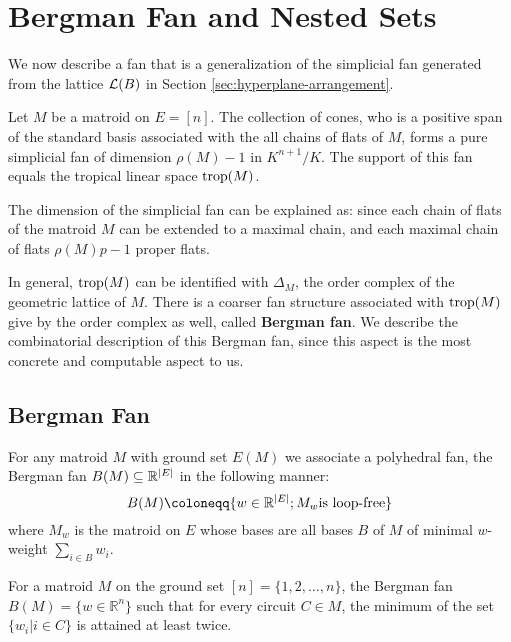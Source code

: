 \section{Bergman Fan and Nested Sets}
\label{sec:bergman-fan-and-nested-sets}
	We now describe a fan that is a generalization of 
	the simplicial fan generated from the lattice $\mathcal{L}(B)$ in Section \ref{sec:hyperplane-arrangement}.
	\begin{theorem}
		Let $M$ be a matroid on $E = [n]$.
		The collection of cones, 
		who is a positive span of the standard basis 
		associated with the all chains of flats of $M$,
		forms a pure simplicial fan of dimension $\rho(M) - 1$
		in $K^{n+1}/K$.
		The support of this fan equals the tropical linear space
		$\operatorname{trop}(M)$.	
	\end{theorem}
	The dimension of the simplicial fan can be explained as:
	since each chain of flats of the matroid $M$ can be extended to 
	a maximal chain, 
	and each maximal chain of flats $\rho(M) p- 1$ proper flats.
	
	In general, 
	$\operatorname{trop}(M)$ can be identified with $\Delta_M$, the order complex of 
	the geometric lattice of $M$.
	There is a coarser fan structure associated with $\operatorname{trop}(M)$ 
	give by the order complex as well, called \textbf{Bergman fan}.
	We describe the combinatorial description of this Bergman fan,
	since this aspect is the most concrete and computable aspect to us. 
	
    \subsection{Bergman Fan}
    \label{subsec:bergman-fan}
        \begin{definition}
        \label{def:bergman-fan}
            For any matroid $M$ with ground set $E(M)$
            we associate a polyhedral fan, 
		    the Bergman fan $B(M) \subseteq \mathbb{R}^{|E|}$ 
		    in the following manner:
            \[
            B(M) \coloneqq \{w \in \R^{|E|}; M_w \text{is loop-free}\}
            \] 
            where $M_w$ is the matroid on $E$ 
            whose bases are all bases $B$ of $M$ of minimal 
		    $w$-weight $\sum_{i \in B}w_i$. 
        \end{definition} 

	    \begin{definition}
	    \label{def:bergman-fan-2}
    	    For a matroid $M$ on the ground set $[n] = \{1, 2, \ldots, n\}$,
    	    the Bergman fan $B(M) = \{w \in \mathbb{R}^n\}$ 
    	    such that for every circuit $C \in M$,
    	    the minimum of the set $\{w_i | i \in C\}$ is attained 
		    at least twice.
        \end{definition}
    
